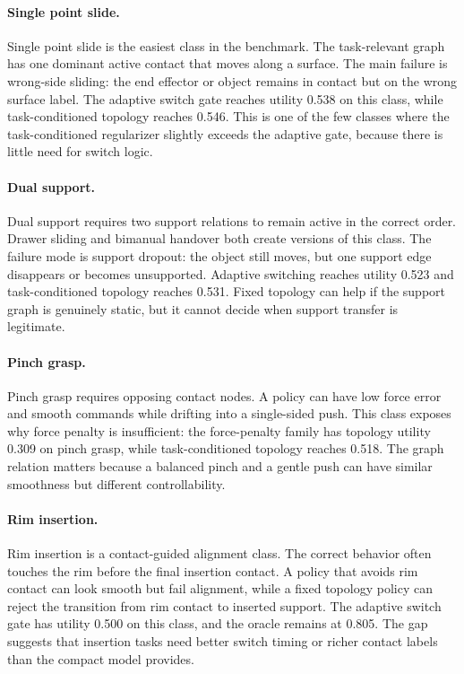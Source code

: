\documentclass{article}
\begin{document}
\paragraph{Single point slide.}
Single point slide is the easiest class in the benchmark. The task-relevant graph has one dominant active contact that moves along a surface. The main failure is wrong-side sliding: the end effector or object remains in contact but on the wrong surface label. The adaptive switch gate reaches utility 0.538 on this class, while task-conditioned topology reaches 0.546. This is one of the few classes where the task-conditioned regularizer slightly exceeds the adaptive gate, because there is little need for switch logic.

\paragraph{Dual support.}
Dual support requires two support relations to remain active in the correct order. Drawer sliding and bimanual handover both create versions of this class. The failure mode is support dropout: the object still moves, but one support edge disappears or becomes unsupported. Adaptive switching reaches utility 0.523 and task-conditioned topology reaches 0.531. Fixed topology can help if the support graph is genuinely static, but it cannot decide when support transfer is legitimate.

\paragraph{Pinch grasp.}
Pinch grasp requires opposing contact nodes. A policy can have low force error and smooth commands while drifting into a single-sided push. This class exposes why force penalty is insufficient: the force-penalty family has topology utility 0.309 on pinch grasp, while task-conditioned topology reaches 0.518. The graph relation matters because a balanced pinch and a gentle push can have similar smoothness but different controllability.

\paragraph{Rim insertion.}
Rim insertion is a contact-guided alignment class. The correct behavior often touches the rim before the final insertion contact. A policy that avoids rim contact can look smooth but fail alignment, while a fixed topology policy can reject the transition from rim contact to inserted support. The adaptive switch gate has utility 0.500 on this class, and the oracle remains at 0.805. The gap suggests that insertion tasks need better switch timing or richer contact labels than the compact model provides.
\end{document}
